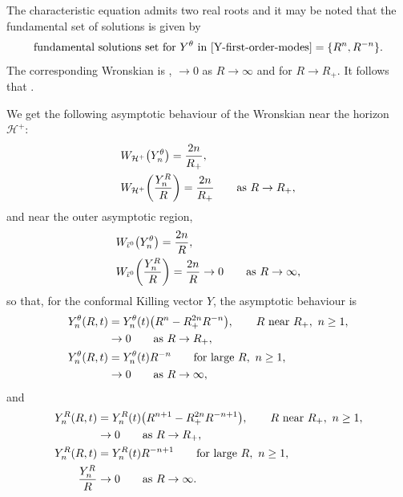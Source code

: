 \documentclass[pdftex]{sigma}
\numberwithin{equation}{section}
\begin{document}
The characteristic equation admits two real roots and it may be noted that the fundamental set of solutions is given by
\begin{align*}
 \text{fundamental solutions set for $Y^\theta$ in \eqref{Y-first-order-modes}} = \{ R^n, R^{-n} \}.
\end{align*}
The corresponding Wronskian is , $\to 0$ as $R \to \infty$ and  for $R \to R_+$. It follows that .

We get the following asymptotic behaviour of the Wronskian near the horizon $\mathcal{H}^{+}$:
\begin{align*}
&W_{\mathcal{H}^+} \bigl(Y_n^\theta\bigr)= \frac{2n}{R_+}, \notag\\
&W_{\mathcal{H}^+} \biggl(\frac{Y_n^R}{R}\biggr)= \frac{2n}{R_+} \qquad \text{as} \ R \to R_+,
\end{align*}
and near the outer asymptotic region,
\begin{align*}
&W_{\bar{\iota}^0} \bigl(Y_n^\theta\bigr)= \frac{2n}{R}, \notag\\
&W_{\bar{\iota}^0} \biggl(\frac{Y_n^R}{R}\biggr)= \frac{2n}{R} \to 0 \qquad \text{as} \ R \to \infty,
\end{align*}
so that, for the conformal Killing vector $Y$, the asymptotic behaviour is
\begin{subequations} \label{Y-theta-asym}
\begin{align}
	Y_n^ \theta (R, t)&{}= Y_n^\theta (t) \bigl(R^n - R^{2n}_+ R^{-n}\bigr), \qquad R \ \text{near} \ R_+, \ n \geq 1, \notag \\
	&{} \to 0 \qquad \text{as} \ R \to R_+, \\
	Y_n^\theta (R, t)&= Y_n^\theta (t) R^{-n} \qquad \text{for large} \ R, \ n \geq 1, \notag\\
	&{} \to 0 \qquad \text{as} \ R \to \infty,
\end{align}
\end{subequations}
and
\begin{subequations} \label{Y-R-asym}
	\begin{align}
	Y_n^ R (R, t)&{}= Y_n^R (t) \bigl(R^{n+1} - R^{2n}_+ R^{-n+1}\bigr), \qquad R \ \text{near} \ R_+, \ n \geq 1, \notag \\
	&{} \to 0 \qquad \text{as} \ R \to R_+ ,\\
	Y_n^R (R, t)&= Y_n^R (t) R^{-n+1} \qquad \text{for large} \ R, \ n \geq 1, \notag\\
\frac{Y_n^R}{R}	 &{}\to 0 \qquad \text{as} \ R \to \infty.
	\end{align}
\end{subequations}
\end{document}
